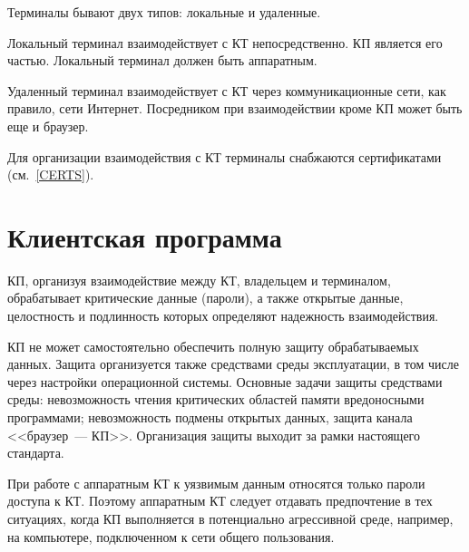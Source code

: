 Терминалы бывают двух типов: локальные и удаленные.

Локальный терминал взаимодействует с КТ непосредственно. КП является 
его частью. Локальный терминал должен быть аппаратным.

Удаленный терминал взаимодействует с КТ через коммуникационные сети,
как правило, сети Интернет. Посредником при взаимодействии 
кроме КП может быть еще и браузер. 

Для организации взаимодействия с КТ терминалы снабжаются сертификатами
(см.~\ref{CERTS}).

\section{Клиентская программа}

КП, организуя взаимодействие между КТ, владельцем и терминалом,
обрабатывает критические данные (пароли), а также открытые данные, 
целостность и подлинность которых определяют надежность  
взаимодействия.

КП не может самостоятельно 
обеспечить полную защиту обрабатываемых данных. 
Защита организуется также средствами среды эксплуатации, 
в том числе через настройки операционной системы.  
%
Основные задачи защиты средствами среды: 
невозможность чтения критических областей памяти вредоносными программами; 
невозможность подмены открытых данных,
защита канала <<браузер~--- КП>>.
%
Организация защиты выходит за рамки настоящего стандарта.

При работе с аппаратным КТ к уязвимым  данным
относятся только пароли доступа к КТ. Поэтому аппаратным КТ следует отдавать 
предпочтение в тех ситуациях, когда КП выполняется в потенциально агрессивной 
среде, например, на компьютере, подключенном к сети общего пользования.






